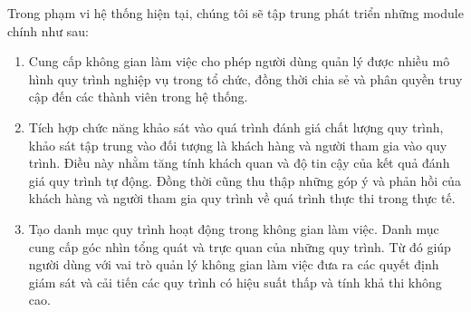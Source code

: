 Trong phạm vi hệ thống hiện tại, chúng tôi sẽ tập trung phát triển những module
chính như sau:

\begin{enumerate}
      \item Cung cấp không gian làm việc cho phép người dùng quản lý được nhiều mô hình quy trình nghiệp vụ trong tổ chức, đồng thời chia sẻ và phân quyền truy cập đến các thành viên trong hệ thống.

      \item Tích hợp chức năng khảo sát vào quá trình đánh giá chất lượng quy trình, khảo sát tập trung vào đối tượng là khách hàng và người tham gia vào quy trình. Điều này nhằm tăng tính khách quan và độ tin cậy của kết quả đánh giá quy trình tự động. Đồng thời cũng thu thập những góp ý và phản hồi của khách hàng và người tham gia quy trình về quá trình thực thi trong thực tế.

      \item Tạo danh mục quy trình hoạt động trong không gian làm việc. Danh mục cung cấp góc nhìn tổng quát và trực quan của những quy trình. Từ đó giúp người dùng với vai trò quản lý không gian làm việc đưa ra các quyết định giám sát và cải tiến các quy trình có hiệu suất thấp và tính khả thi không cao.
\end{enumerate}